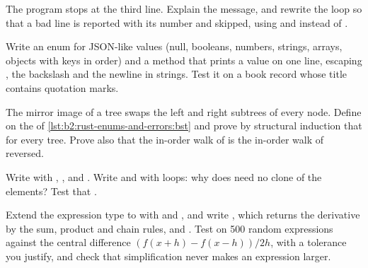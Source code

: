 \begin{exercise}[$\star\star$]\label{exo:b2:rust-enums-and-errors:6}
The program stops at the third line. Explain the message, and rewrite the loop so that a bad line is reported with
its number and skipped, using  and  instead of .
\end{exercise}

\begin{exercise}[$\star\star$]\label{exo:b2:rust-enums-and-errors:7}
Write an enum  for JSON-like values (null, booleans, numbers, strings, arrays, objects with keys in
order) and a method  that prints a value on one line, escaping , the backslash and the newline
in strings. Test it on a book record whose title contains quotation marks.
\end{exercise}

\begin{exercise}[$\star\star$]\label{exo:b2:rust-enums-and-errors:8}
The mirror image of a tree swaps the left and right subtrees of every node. Define  on the 
of \cref{lst:b2:rust-enums-and-errors:bst} and prove by structural induction that  for
every tree. Prove also that the in-order walk of  is the in-order walk of  reversed.
\end{exercise}

\begin{exercise}[$\star\star$]\label{exo:b2:rust-enums-and-errors:9}
Write  with , ,  and
. Write  and  with loops: why does  need no clone of the elements? Test that
.
\end{exercise}

\begin{exercise}[$\star\star\star$]\label{exo:b2:rust-enums-and-errors:10}
Extend the expression type to  with  and , and write , which returns the
derivative by the sum, product and chain rules, and . Test  on 500 random expressions
against the central difference $(f(x + h) - f(x - h)) / 2h$, with a tolerance you justify, and check that
simplification never makes an expression larger.
\end{exercise}


